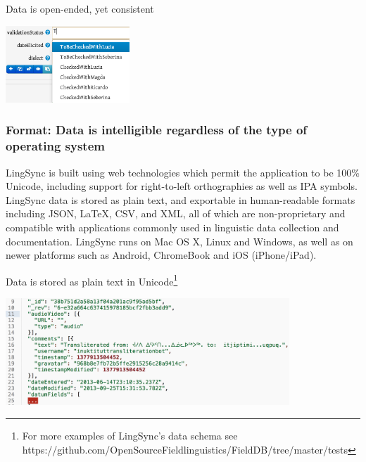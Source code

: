 \documentclass[letterpaper, 12pt, dvips]{mitwpl}
\begin{document}
\begin{exe} 
\ex Data is open-ended, yet consistent

 \centering
    \includegraphics[width=0.35\textwidth]{typeaheadForPreviousCategories}

\label{ex:consistent}
\end{exe}

\subsubsection{\textbf{Format}: Data is intelligible regardless of the type of operating system}
 
LingSync is built using web technologies which permit the application to be 100\% Unicode, including support for right-to-left orthographies as well as IPA symbols. LingSync data is stored as plain text, and exportable in human-readable formats including JSON, LaTeX, CSV, and XML, all of which are non-proprietary and compatible with applications commonly used in linguistic data collection and documentation. LingSync runs on Mac OS X, Linux and Windows, as well as on newer platforms such as Android, ChromeBook and iOS (iPhone/iPad).

\begin{exe} 
\ex Data is stored as plain text in Unicode\footnote{For more examples of LingSync's data schema see\\ https://github.com/OpenSourceFieldlinguistics/FieldDB/tree/master/tests}

 \centering
    \includegraphics[width=0.8\textwidth]{dataIsPlainTextUnicode}

\label{ex:intelligible}
\end{exe}
\end{document}
